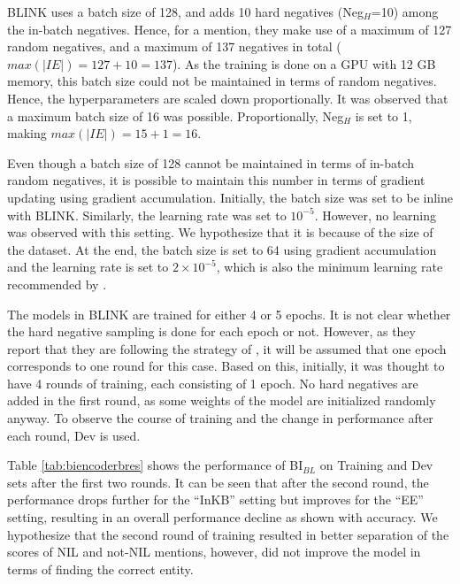 \documentclass{report}
\theoremstyle{definition}
\theoremstyle{remark}
\begin{document}
BLINK uses a batch size of 128, and adds 10 hard negatives (Neg$_H$=10) among the in-batch negatives. Hence, for a mention, they make use of a maximum of 127 random negatives, and a maximum of 137 negatives in total ($max(|IE|)=127+10=137$). As the training is done on a GPU with 12 GB memory, this batch size could not be maintained in terms of random negatives. Hence, the hyperparameters are scaled down proportionally. It was observed that a maximum batch size of 16 was possible. Proportionally, Neg$_H$ is set to 1, making $max(|IE|)=15+1=16$.

Even though a batch size of 128 cannot be maintained in terms of in-batch random negatives, it is possible to maintain this number in terms of gradient updating using gradient accumulation. Initially, the batch size was set to be inline with BLINK. Similarly, the learning rate was set to $10^{-5}$. However, no learning was observed with this setting. We hypothesize that it is because of the size of the dataset. At the end, the batch size is set to 64 using gradient accumulation and the learning rate is set to $2 \times 10^{-5}$, which is also the minimum learning rate recommended by \cite{BERT}.

The models in BLINK are trained for either 4 or 5 epochs. It is not clear whether the hard negative sampling is done for each epoch or not. However, as they report that they are following the strategy of \cite{googleintern}, it will be assumed that one epoch corresponds to one round for this case. Based on this, initially, it was thought to have 4 rounds of training, each consisting of 1 epoch. No hard negatives are added in the first round, as some weights of the model are initialized randomly anyway. To observe the course of training and the change in performance after each round, Dev is used.

Table \ref{tab:biencoderbres} shows the performance of BI$_{BL}$ on Training and Dev sets after the first two rounds. It can be seen that after the second round, the performance drops further for the ``InKB'' setting but improves for the ``EE'' setting, resulting in an overall performance decline as shown with accuracy. We hypothesize that the second round of training resulted in better separation of the scores of NIL and not-NIL mentions, however, did not improve the model in terms of finding the correct entity. 
\end{document}
